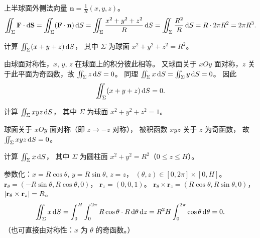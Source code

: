 \documentclass{article}
\begin{document}
\begin{solution}
  上半球面外侧法向量 $\mathbf{n} = \frac{1}{R}(x, y, z)$。
  \[
    \iint_\Sigma \mathbf{F} \cdot \mathrm{d}\mathbf{S}
    = \iint_\Sigma (\mathbf{F} \cdot \mathbf{n}) \,\mathrm{d} S
    = \iint_\Sigma \frac{x^2+y^2+z^2}{R} \,\mathrm{d} S
    = \iint_\Sigma \frac{R^2}{R} \,\mathrm{d} S
    = R \cdot 2\pi R^2
    = 2\pi R^3.
  \]
\end{solution}

\begin{exercise}
  计算 $\iint_\Sigma (x+y+z) \,\mathrm{d} S$，
  其中 $\Sigma$ 为球面 $x^2+y^2+z^2 = R^2$。
\end{exercise}

\begin{solution}
  由球面对称性，$x$, $y$, $z$ 在球面上的积分彼此相等。
  又球面关于 $xOy$ 面对称，$z$ 关于此平面为奇函数，故
  $\iint_\Sigma z \,\mathrm{d} S = 0$。
  同理 $\iint_\Sigma x \,\mathrm{d} S = \iint_\Sigma y \,\mathrm{d} S = 0$。
  因此
  \[
    \iint_\Sigma (x+y+z) \,\mathrm{d} S = 0.
  \]
\end{solution}

\begin{exercise}
  计算 $\iint_\Sigma xyz \,\mathrm{d} S$，
  其中 $\Sigma$ 为球面 $x^2+y^2+z^2 = 1$。
\end{exercise}

\begin{solution}
  球面关于 $xOy$ 面对称（即 $z \to -z$ 对称），
  被积函数 $xyz$ 关于 $z$ 为奇函数，
  故 $\iint_\Sigma xyz \,\mathrm{d} S = 0$。
\end{solution}

\begin{exercise}
  计算 $\iint_\Sigma x \,\mathrm{d} S$，
  其中 $\Sigma$ 为圆柱面 $x^2+y^2=R^2$（$0 \le z \le H$）。
\end{exercise}

\begin{solution}
  参数化：$x = R\cos\theta$, $y = R\sin\theta$, $z = z$，
  $(\theta, z) \in [0, 2\pi] \times [0, H]$。
  $\mathbf{r}_\theta = (-R\sin\theta, R\cos\theta, 0)$，
  $\mathbf{r}_z = (0, 0, 1)$。
  $\mathbf{r}_\theta \times \mathbf{r}_z = (R\cos\theta, R\sin\theta, 0)$，
  $\left| \mathbf{r}_\theta \times \mathbf{r}_z \right| = R$。
  \[
    \iint_\Sigma x \,\mathrm{d} S = \int_0^H \int_0^{2\pi} R\cos\theta \cdot R \,\mathrm{d}\theta \,\mathrm{d} z
    = R^2 H \int_0^{2\pi} \cos\theta \,\mathrm{d}\theta = 0.
  \]
  （也可直接由对称性：$x$ 为 $\theta$ 的奇函数。）
\end{solution}
\end{document}
